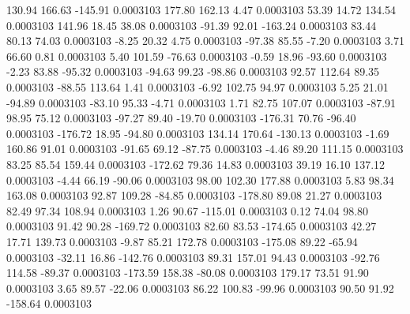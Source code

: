       130.94      166.63     -145.91     0.0003103
      177.80      162.13        4.47     0.0003103
       53.39       14.72      134.54     0.0003103
      141.96       18.45       38.08     0.0003103
      -91.39       92.01     -163.24     0.0003103
       83.44       80.13       74.03     0.0003103
       -8.25       20.32        4.75     0.0003103
      -97.38       85.55       -7.20     0.0003103
        3.71       66.60        0.81     0.0003103
        5.40      101.59      -76.63     0.0003103
       -0.59       18.96      -93.60     0.0003103
       -2.23       83.88      -95.32     0.0003103
      -94.63       99.23      -98.86     0.0003103
       92.57      112.64       89.35     0.0003103
      -88.55      113.64        1.41     0.0003103
       -6.92      102.75       94.97     0.0003103
        5.25       21.01      -94.89     0.0003103
      -83.10       95.33       -4.71     0.0003103
        1.71       82.75      107.07     0.0003103
      -87.91       98.95       75.12     0.0003103
      -97.27       89.40      -19.70     0.0003103
     -176.31       70.76      -96.40     0.0003103
     -176.72       18.95      -94.80     0.0003103
      134.14      170.64     -130.13     0.0003103
       -1.69      160.86       91.01     0.0003103
      -91.65       69.12      -87.75     0.0003103
       -4.46       89.20      111.15     0.0003103
       83.25       85.54      159.44     0.0003103
     -172.62       79.36       14.83     0.0003103
       39.19       16.10      137.12     0.0003103
       -4.44       66.19      -90.06     0.0003103
       98.00      102.30      177.88     0.0003103
        5.83       98.34      163.08     0.0003103
       92.87      109.28      -84.85     0.0003103
     -178.80       89.08       21.27     0.0003103
       82.49       97.34      108.94     0.0003103
        1.26       90.67     -115.01     0.0003103
        0.12       74.04       98.80     0.0003103
       91.42       90.28     -169.72     0.0003103
       82.60       83.53     -174.65     0.0003103
       42.27       17.71      139.73     0.0003103
       -9.87       85.21      172.78     0.0003103
     -175.08       89.22      -65.94     0.0003103
      -32.11       16.86     -142.76     0.0003103
       89.31      157.01       94.43     0.0003103
      -92.76      114.58      -89.37     0.0003103
     -173.59      158.38      -80.08     0.0003103
      179.17       73.51       91.90     0.0003103
        3.65       89.57      -22.06     0.0003103
       86.22      100.83      -99.96     0.0003103
       90.50       91.92     -158.64     0.0003103
